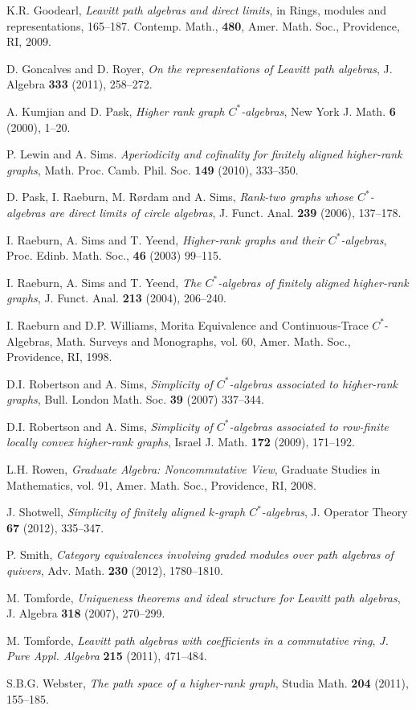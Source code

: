 \documentclass[a4paper,12pt]{amsart}
\numberwithin{equation}{section}
\theoremstyle{definition}
\theoremstyle{remark}
\begin{document}
\begin{thebibliography}{99}
  K.R. Goodearl, \emph{Leavitt path algebras and direct limits}, in Rings, modules and representations, 
165--187.
Contemp. Math., \textbf{480}, Amer. Math. Soc., Providence, RI, 2009.

 
 D. Goncalves and D. Royer, 
\emph{On the representations of Leavitt path algebras},
J. Algebra \textbf{333} (2011), 258--272.

 A. Kumjian and D. Pask, \emph{Higher rank graph {$C^\ast$}-algebras}, New
  York J. Math. \textbf{6} (2000), 1--20.
  
 P. Lewin and A. Sims. \emph{Aperiodicity and cofinality for finitely aligned higher-rank graphs},
Math. Proc. Camb. Phil. Soc. \textbf{149} (2010), 333--350.

 D. Pask, I. Raeburn, M. R{\o}rdam and  A. Sims, \emph{Rank-two graphs whose $C^*$-algebras are direct limits of circle algebras}, J. Funct. Anal. \textbf{239} (2006), 137--178.

 I. Raeburn, A. Sims and T. Yeend, 
\emph{Higher-rank graphs and their $C^{*}$-algebras}, 
 Proc. Edinb. Math. Soc., \textbf{46} (2003) 99--115.

 I. Raeburn, A. Sims and T. Yeend, 
\emph{The $C^{*}$-algebras of finitely aligned higher-rank graphs},
 J. Funct. Anal. \textbf{213} (2004), 206--240. 
 
 I. Raeburn  and D.P. Williams, Morita Equivalence and Continuous-Trace {$C^*$}-Algebras, Math. 
Surveys and Monographs, vol. 60, Amer. Math. Soc., Providence, RI, 1998. 

  D.I. Robertson and A. Sims, 
\emph{Simplicity of $C^*$-algebras associated to higher-rank graphs}, Bull. London Math. Soc. \textbf{39} (2007) 337--344.

 D.I. Robertson and A. Sims, \emph{Simplicity of {$C^\ast$}-algebras
  associated to row-finite locally convex higher-rank graphs}, Israel J. Math. \textbf{172}
 (2009), 171--192. 
 
  L.H. Rowen, \emph{Graduate Algebra: Noncommutative View}, Graduate Studies in Mathematics, vol. 91, Amer. Math. Soc., Providence, RI, 2008.

 J. Shotwell, \emph{Simplicity of finitely aligned $k$-graph $C^*$-algebras},
J. Operator Theory \textbf{67} (2012), 335--347.

 P. Smith,  \emph{Category equivalences involving graded modules over path algebras of quivers}, Adv. Math. \textbf{230} (2012),  1780--1810.

  M. Tomforde, \emph{Uniqueness theorems and ideal structure for Leavitt path algebras},  J. Algebra \textbf{318} (2007), 270--299. 
 
  M. Tomforde, \emph{Leavitt path algebras with coefficients in a commutative ring},
\emph{J. Pure Appl. Algebra} \textbf{215} (2011), 471--484.

  S.B.G. Webster, \emph{The path space of a higher-rank graph}, Studia Math. \textbf{204}
(2011), 155--185.
\end{thebibliography}
\end{document}
